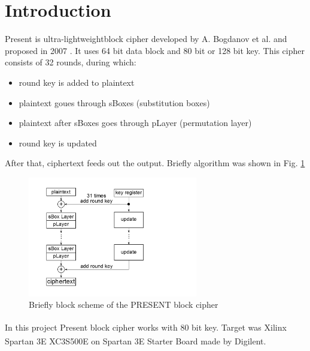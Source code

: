 \documentclass{gajewski}
\begin{document}
\maketitle

\newpage

\revisionTable

\newpage

\tableofcontents
\newpage

\section{Introduction}

Present is \textgravedbl ultra-lightweight\textacutedbl \space block cipher developed by A. Bogdanov et al. and proposed in 2007 \cite{PRESENT}. It uses 64 bit data block and 80 bit or 128 bit key.
This cipher consists of 32 rounds, during which: 
\begin{itemize}
    \item round key is added to plaintext
    \item plaintext goues through sBoxes (substitution boxes)
    \item plaintext after sBoxes goes through pLayer (permutation layer)
    \item round key is updated
\end{itemize}
After that, ciphertext feeds out the output. Briefly algorithm was shown in Fig. \ref{pAlgorithm}
\begin{figure}[!ht]%
    \begin{center}
    \includegraphics[width=0.66\textwidth]{img/presentAlgorithm.png}
    \caption{%
        Briefly block scheme of the PRESENT block cipher
     }%
    \label{pAlgorithm}
    \end{center}
 \end{figure}
In this project Present block cipher works with 80 bit key. Target was Xilinx\textsuperscript{\textregistered} Spartan 3E XC3S500E \cite{Spartan} on Spartan 3E  Starter Board \cite{Digilent} made by Digilent\textsuperscript{\textregistered}.
\end{document}
